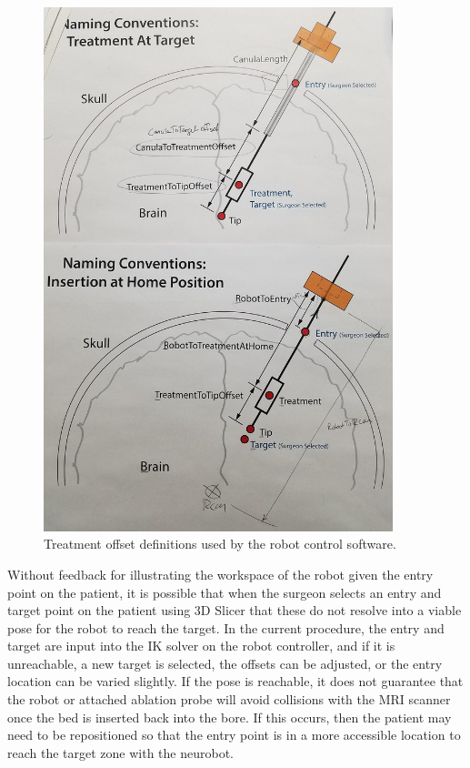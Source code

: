 \documentclass[12pt]{report}
\makeatletter
\renewcommand{\todo}[2][]{%
    \@todo[caption={#2}, #1]{\begin{spacing}{0.5}#2\end{spacing}}%
}
\makeatother
\begin{document}
\begin{figure}[thpb]
	\centering
	\includegraphics[width=4in]{diagrams/neuro_offsets_flip.jpg}
    \todo[inline]{GF: Get originals}
    \caption{Treatment offset definitions used by the robot control software. }
    \label{fig:offsetConventions}
\end{figure}

Without feedback for illustrating the workspace of the robot given the entry point on the patient, it is possible that when the surgeon selects an entry and target point on the patient using 3D Slicer that these do not resolve into a viable pose for the robot to reach the target. In the current procedure, the entry and target are input into the IK solver on the robot controller, and if it is unreachable, a new target is selected, the offsets can be adjusted, or the entry location can be varied slightly. If the pose is reachable, it does not guarantee that the robot or attached ablation probe will avoid collisions with the MRI scanner once the bed is inserted back into the bore. If this occurs, then the patient may need to be repositioned so that the entry point is in a more accessible location to reach the target zone with the neurobot.
\end{document}
